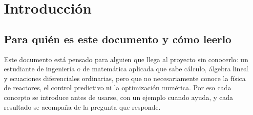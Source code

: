 \section{Introducción}\label{sec:intro}

\subsection{Para quién es este documento y cómo leerlo}
Este documento está pensado para alguien que llega al proyecto sin conocerlo: un estudiante
de ingeniería o de matemática aplicada que sabe cálculo, álgebra lineal y ecuaciones
diferenciales ordinarias, pero que no necesariamente conoce la física de reactores, el
control predictivo ni la optimización numérica. Por eso cada concepto se introduce antes de
usarse, con un ejemplo cuando ayuda, y cada resultado se acompaña de la pregunta que
responde.


